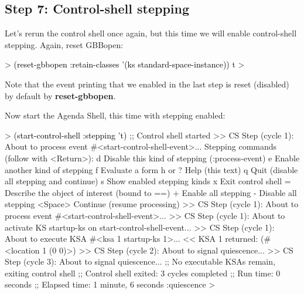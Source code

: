 \documentclass[10pt,twoside,english,pdftex]{article}
\begin{document}
\subsection*{Step 7: Control-shell stepping}

%
Let's rerun the control shell once again, but this time we will enable
control-shell stepping. Again, reset GBBopen:
%
\begin{example}\color{darkergray}%
  > \textcolor{black}{(reset-gbbopen :retain-classes '(ks standard-space-instance))}
  t
  >
\end{example}
%
Note that the event printing that we enabled in the last step is reset
(disabled) by default by \textbf{reset-gbbopen}.

%
Now start the Agenda Shell, this time with stepping enabled:
%
\begin{example}\color{darkergray}%
  > \textcolor{black}{(start-control-shell :stepping 't)}
  ;; Control shell started
  >> CS Step (cycle 1):
     About to process event #<start-control-shell-event>... 
  Stepping commands (follow with <Return>):
     d       Disable this kind of stepping (:process-event)
     e       Enable another kind of stepping
     f       Evaluate a form
     h or ?  Help (this text)
     q       Quit (disable all stepping and continue)
     s       Show enabled stepping kinds
     x       Exit control shell
     =       Describe the object of interest (bound to ==)
     +       Enable all stepping
     -       Disable all stepping
     <Space> Continue (resume processing)
  >> CS Step (cycle 1):
     About to process event #<start-control-shell-event>...  
  >> CS Step (cycle 1):
     About to activate KS startup-ks on
       start-control-shell-event... 
  >> CS Step (cycle 1):
     About to execute KSA #<ksa 1 startup-ks 1>... 
  << KSA 1 returned: (#<location 1 (0 0)>)
  >> CS Step (cycle 2):
     About to signal quiescence... 
  >> CS Step (cycle 3):
     About to signal quiescence... 
  ;; No executable KSAs remain, exiting control shell
  ;; Control shell exited: 3 cycles completed
  ;; Run time: 0 seconds
  ;; Elapsed time: 1 minute, 6 seconds
  :quiescence
  >
\end{example}


\T\markright{}%
\T\pagestyle{plain}
\T\cleardoublepage
\W{}
\T\pagestyle{fancy}
\T\thispagestyle{fancybottom}
\T\renewcommand{\headrulewidth}{0pt}
\end{document}
